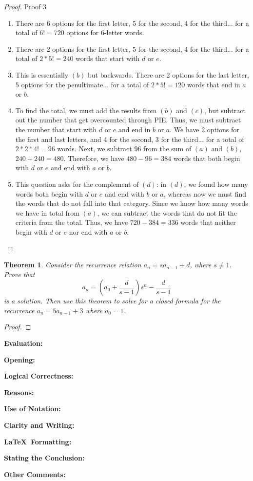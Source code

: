 \documentclass[11pt,titlepage]{article}		%
\def\rubric{\textbf{Evaluation:} \makebox[0.75in]{\hrulefill}

\vspace{.3in}

\textbf{Opening:} \makebox[0.75in]{\hrulefill}

\vspace{.3in}

\textbf{Logical Correctness:} \makebox[0.75in]{\hrulefill}

\vspace{.3in}

\textbf{Reasons:} \makebox[0.75in]{\hrulefill}

\vspace{.3in}

\textbf{Use of Notation:} \makebox[0.75in]{\hrulefill}

\vspace{.3in}

\textbf{Clarity and Writing:} \makebox[0.75in]{\hrulefill}

\vspace{.3in}

\textbf{\LaTeX\ Formatting:} \makebox[0.75in]{\hrulefill}

\vspace{.3in}

\textbf{Stating the Conclusion:} \makebox[0.75in]{\hrulefill}

\vspace{.3in}

\textbf{Other Comments:}

\vspace{1in}

}
\theoremstyle{theorem}
\newtheorem{theorem}{Theorem}
\begin{document}
\begin{proof}
Proof 3
\begin{enumerate}[label=(\alph*)]
\item There are 6 options for the first letter, 5 for the second, 4 for the third... for a total of $6! = 720$ options for 6-letter words.
\item There are 2 options for the first letter, 5 for the second, 4 for the third... for a total of $2*5! = 240$ words that start with $d$ or $e$.
\item This is essentially $(b)$ but backwards. There are 2 options for the last letter, 5 options for the penultimate... for a total of $2*5!=120$ words that end in $a$ or $b$.
\item To find the total, we must add the results from $(b)$ and $(c)$, but subtract out the number that get overcounted through PIE. Thus, we must subtract the number that start with $d$ or $e$ and end in $b$ or $a$. We have 2 options for the first and last letters, and 4 for the second, 3 for the third... for a total of $2*2*4! = 96$ words. Next, we subtract $96$ from the sum of $(a)$ and $(b)$, $240 + 240 = 480$. Therefore, we have $480 - 96 = 384$ words that both begin with $d$ or $e$ and end with $a$ or $b$.
\item This question asks for the complement of $(d)$: in $(d)$, we found how many words both begin with $d$ or $e$ and end with $b$ or $a$, whereas now we must find the words that do not fall into that category. Since we know how many words we have in total from $(a)$, we can subtract the words that do not fit the criteria from the total. Thus, we have $720 - 384 = 336$ words that neither begin with $d$ or $e$ nor end with $a$ or $b$.
\end{enumerate}
\end{proof}

\clearpage

\begin{theorem}
    Consider the recurrence relation $a_n = s a_{n-1}+d$, where $s\ne 1$.
    Prove that
    \[
        a_n = \left(a_0 + \frac{d}{s-1}\right) s^n - \frac{d}{s-1}
    \]
    is a solution. Then use this theorem to solve for a closed formula for the recurrence $a_n = 5 a_{n-1} + 3$ where $a_0 = 1$.
\end{theorem}

\begin{proof}

\end{proof}
\clearpage

\rubric
\end{document}

